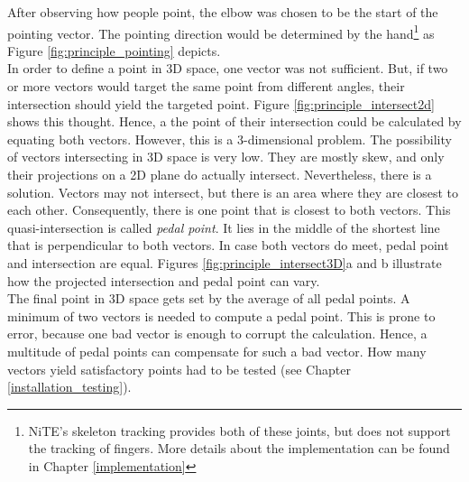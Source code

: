 After observing how people point, the elbow was chosen to be the start of the pointing vector. The pointing direction would be determined by the hand\footnote{NiTE's skeleton tracking provides both of these joints, but does not support the tracking of fingers. More details about the implementation can be found in Chapter \ref{implementation}} as Figure \ref{fig:principle_pointing} depicts.
\\
In order to define a point in \ac{3D} space, one vector was not sufficient. But, if two or more vectors would target the same point from different angles, their intersection should yield the targeted point. Figure \ref{fig:principle_intersect2d} shows this thought. Hence, a the point of their intersection could be calculated by equating both vectors. However, this is a 3-dimensional problem. The possibility of vectors intersecting in \ac{3D} space is very low. They are mostly skew, and only their projections on a \ac{2D} plane do actually intersect. Nevertheless, there is a solution. Vectors may not intersect, but there is an area where they are closest to each other. Consequently, there is one point that is closest to both vectors. This quasi-intersection is called \textit{pedal point}. It lies in the middle of the shortest line that is perpendicular to both vectors. In case both vectors do meet, pedal point and intersection are equal. Figures \ref{fig:principle_intersect3D}a and b illustrate how the projected intersection and pedal point can vary.
\\
The final point in \ac{3D} space gets set by the average of all pedal points. A minimum of two vectors is needed to compute a pedal point. This is prone to error, because one bad vector is enough to corrupt the calculation. Hence, a multitude of pedal points can compensate for such a bad vector. How many vectors yield satisfactory points had to be tested (see Chapter \ref{installation_testing}).


